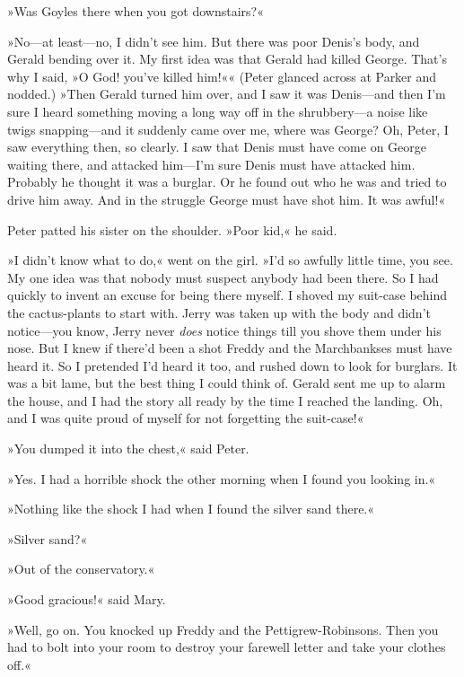 »Was Goyles there when you got downstairs?«

»No\allowbreak---\allowbreak at least\allowbreak---\allowbreak no, I didn't see him. But there was poor Denis's body, and Gerald bending over it. My first idea was that Gerald had killed George. That's why I said, »O God! you've killed him!«« (Peter glanced across at Parker and nodded.) »Then Gerald turned him over, and I saw it was Denis\allowbreak---\allowbreak and then I'm sure I heard something moving a long way off in the shrubbery\allowbreak---\allowbreak a noise like twigs snapping\allowbreak---\allowbreak and it suddenly came over me, where was George? Oh, Peter, I saw everything then, so clearly. I saw that Denis must have come on George waiting there, and attacked him\allowbreak---\allowbreak I'm sure Denis must have attacked him. Probably he thought it was a burglar. Or he found out who he was and tried to drive him away. And in the struggle George must have shot him. It was awful!«

Peter patted his sister on the shoulder. »Poor kid,« he said.

»I didn't know what to do,« went on the girl. »I'd so awfully little time, you see. My one idea was that nobody must suspect anybody had been there. So I had quickly to invent an excuse for being there myself. I shoved my suit-case behind the cactus-plants to start with.  Jerry was taken up with the body and didn't notice\allowbreak---\allowbreak you know, Jerry never \textit{does} notice things till you shove them under his nose. But I knew if there'd been a shot Freddy and the Marchbankses must have heard it. So I pretended I'd heard it too, and rushed down to look for burglars. It was a bit lame, but the best thing I could think of.  Gerald sent me up to alarm the house, and I had the story all ready by the time I reached the landing. Oh, and I was quite proud of myself for not forgetting the suit-case!«

»You dumped it into the chest,« said Peter.

»Yes. I had a horrible shock the other morning when I found you looking in.«

»Nothing like the shock I had when I found the silver sand there.«

»Silver sand?«

»Out of the conservatory.«

»Good gracious!« said Mary.

»Well, go on. You knocked up Freddy and the Pettigrew-Robinsons. Then you had to bolt into your room to destroy your farewell letter and take your clothes off.«

